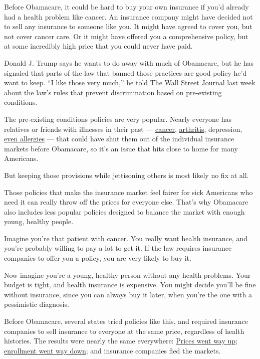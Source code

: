 Before Obamacare, it could be hard to buy your own insurance if you'd
already had a health problem like cancer. An insurance company might
have decided not to sell any insurance to someone like you. It might
have agreed to cover you, but not cover cancer care. Or it might have
offered you a comprehensive policy, but at some incredibly high price
that you could never have paid.

Donald J. Trump says he wants to do away with much of Obamacare, but he
has signaled that parts of the law that banned those practices are good
policy he'd want to keep. ``I like those very much,'' he
\href{http://www.wsj.com/articles/donald-trump-willing-to-keep-parts-of-health-law-1478895339}{told
The Wall Street Journal} last week about the law's rules that prevent
discrimination based on pre-existing conditions.

The pre-existing conditions policies are very popular. Nearly everyone
has relatives or friends with illnesses in their past ---
\href{http://www.coloradohealthagents.com/anthem-bcbs/pre-existing-conditions.html}{cancer},
\href{http://www.indianahealthagents.com/anthem/uninsurable-conditions.pdf}{arthritis},
depression,
\href{http://www.consumerwatchdog.org/newsrelease/pre-existing-health-conditions-cops-firefighters-expectant-dads-and-those-suffering-alle}{even
allergies} --- that could have shut them out of the individual insurance
markets before Obamacare, so it's an issue that hits close to home for
many Americans.

But keeping those provisions while jettisoning others is most likely no
fix at all.

Those policies that make the insurance market feel fairer for sick
Americans who need it can really throw off the prices for everyone else.
That's why Obamacare also includes less popular policies designed to
balance the market with enough young, healthy people.

Imagine you're that patient with cancer. You really want health
insurance, and you're probably willing to pay a lot to get it. If the
law requires insurance companies to offer you a policy, you are very
likely to buy it.

Now imagine you're a young, healthy person without any health problems.
Your budget is tight, and health insurance is expensive. You might
decide you'll be fine without insurance, since you can always buy it
later, when you're the one with a pessimistic diagnosis.

Before Obamacare, several states tried policies like this, and required
insurance companies to sell insurance to everyone at the same price,
regardless of health histories. The results were nearly the same
everywhere:
\href{http://www.sciencedirect.com/science/article/pii/S0047272708001199}{Prices
went way up; enrollment went way down}; and insurance companies fled the
markets.

